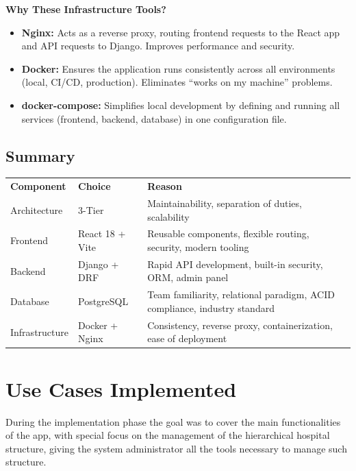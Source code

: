 \documentclass[12pt, a4paper]{article}
\begin{document}
\textbf{Why These Infrastructure Tools?}

\begin{itemize}
  \item \textbf{Nginx:} Acts as a reverse proxy, routing frontend requests to the React app and API requests to Django. Improves performance and security.
  \item \textbf{Docker:} Ensures the application runs consistently across all environments (local, CI/CD, production). Eliminates ``works on my machine'' problems.
  \item \textbf{docker-compose:} Simplifies local development by defining and running all services (frontend, backend, database) in one configuration file.
\end{itemize}
\subsection*{Summary}

\begin{tabular}{L{2.6cm} L{3.4cm} L{7.4cm}}
  \color{white}\bfseries Component &
  \color{white}\bfseries Choice &
  \color{white}\bfseries Reason \\
  Architecture & 3-Tier & Maintainability, separation of duties, scalability \\
  Frontend & React 18 + Vite & Reusable components, flexible routing, security, modern tooling \\
  Backend & Django + DRF & Rapid API development, built-in security, ORM, admin panel \\
  Database & PostgreSQL & Team familiarity, relational paradigm, ACID compliance, industry standard \\
  Infrastructure & Docker + Nginx & Consistency, reverse proxy, containerization, ease of deployment \\
\end{tabular}

\newpage
{} 
\section{Use Cases Implemented}
During the implementation phase the goal was to cover the main functionalities of the app, with special focus on the management of the hierarchical hospital structure, giving the system administrator all the tools necessary to manage such structure.
\end{document}
